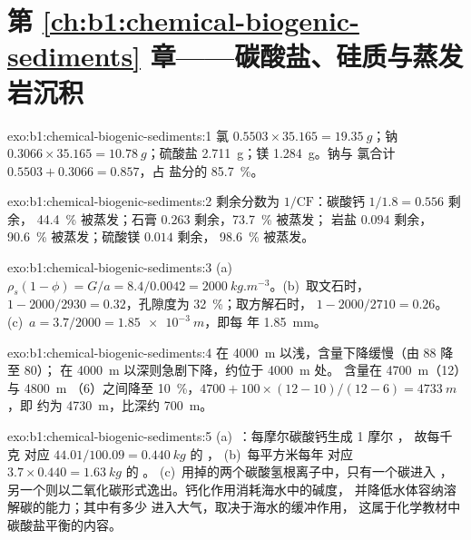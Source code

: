 \section*{第 \ref{ch:b1:chemical-biogenic-sediments} 章——碳酸盐、硅质与蒸发岩沉积}

\begin{solution}{exo:b1:chemical-biogenic-sediments:1}
氯 $0.5503\times35.165 = \qty{19.35}{g}$；钠 $0.3066\times35.165 =
\qty{10.78}{g}$；硫酸盐 \qty{2.711}{g}；镁 \qty{1.284}{g}。钠与
氯合计 $0.5503 + 0.3066 = 0.857$，占
盐分的 \qty{85.7}{\%}。
\end{solution}

\begin{solution}{exo:b1:chemical-biogenic-sediments:2}
剩余分数为 $1/\mathrm{CF}$：碳酸钙 $1/1.8 = 0.556$ 剩余，
\qty{44.4}{\%} 被蒸发；石膏 $0.263$ 剩余，\qty{73.7}{\%} 被蒸发；
岩盐 $0.094$ 剩余，\qty{90.6}{\%} 被蒸发；硫酸镁 $0.014$ 剩余，
\qty{98.6}{\%} 被蒸发。
\end{solution}

\begin{solution}{exo:b1:chemical-biogenic-sediments:3}
(a)~$\rho_s(1-\phi) = G/a = 8.4/0.0042 = \qty{2000}{kg.m^{-3}}$。(b)~取文石时，
$1 - 2000/2930 = 0.32$，孔隙度为 \qty{32}{\%}；取方解石时，
$1 - 2000/2710 = 0.26$。(c)~$a = 3.7/2000 = \qty{1.85e-3}{m}$，即每
年 \qty{1.85}{mm}。
\end{solution}

\begin{solution}{exo:b1:chemical-biogenic-sediments:4}
在 \qty{4000}{m} 以浅，含量下降缓慢（由 88 降至 80）；
在 \qty{4000}{m} 以深则急剧下降，约位于 \qty{4000}{m} 处。
含量在 \qty{4700}{m}（12）与 \qty{4800}{m}
（6）之间降至 \qty{10}{\%}，$4700 + 100\times(12-10)/(12-6) = \qty{4733}{m}$，即
约为 \qty{4730}{m}，比深约 \qty{700}{m}。
\end{solution}

\begin{solution}{exo:b1:chemical-biogenic-sediments:5}
(a)~：每摩尔碳酸钙生成 1 摩尔 ，
故每千克  对应 $44.01/100.09 = \qty{0.440}{kg}$ 的 ，
(b)~每平方米每年  对应 $3.7\times0.440 = \qty{1.63}{kg}$ 的 。
(c)~用掉的两个碳酸氢根离子中，只有一个碳进入
，另一个则以二氧化碳形式逸出。钙化作用消耗海水中的碱度，
并降低水体容纳溶解碳的能力；其中有多少
 进入大气，取决于海水的缓冲作用，
这属于化学教材中碳酸盐平衡的内容。
\end{solution}

